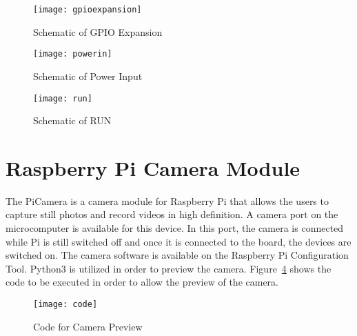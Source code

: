 \begin{figure}[!htbp]
	\centering
		\texttt{[image: gpioexpansion]}
	\caption{Schematic of GPIO Expansion~\cite{Schem}}
	\label{fig:gpioexpansion}
\end{figure}

\begin{figure}[!htbp]
	\centering
		\texttt{[image: powerin]}
	\caption{Schematic of Power Input~\cite{Schem}}
	\label{fig:powerin}
\end{figure}

\begin{figure}[!htbp]
	\centering
		\texttt{[image: run]}
	\caption{Schematic of RUN~\cite{Schem}}
	\label{fig:run}
\end{figure}

\section{Raspberry Pi Camera Module}

The PiCamera is a camera module for Raspberry Pi that allows the users to capture still photos and record videos in high definition. A camera port on the microcomputer is available for this device. In this port, the camera is connected while Pi is still switched off and once it is connected to the board, the devices are switched on. The camera software is available on the Raspberry Pi Configuration Tool. Python3 is utilized in order to preview the camera. Figure~\ref{fig:code} shows the code to be executed in order to allow the preview of the camera.~\cite{camers}

\begin{figure}[!htbp]
	\centering
		\texttt{[image: code]}
	\caption{Code for Camera  Preview}
	\label{fig:code}
\end{figure}

